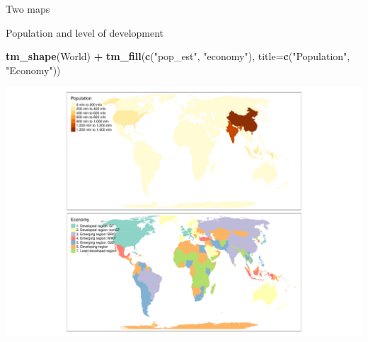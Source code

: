 \documentclass[
  ignorenonframetext,
]{beamer}
\newenvironment{Shaded}{\begin{snugshade}}{\end{snugshade}}
\newcommand{\DataTypeTok}[1]{\textcolor[rgb]{0.13,0.29,0.53}{#1}}
\newcommand{\KeywordTok}[1]{\textcolor[rgb]{0.13,0.29,0.53}{\textbf{#1}}}
\newcommand{\NormalTok}[1]{#1}
\newcommand{\OperatorTok}[1]{\textcolor[rgb]{0.81,0.36,0.00}{\textbf{#1}}}
\newcommand{\StringTok}[1]{\textcolor[rgb]{0.31,0.60,0.02}{#1}}
\begin{document}
\begin{frame}[fragile]{Two maps}
\protect\hypertarget{two-maps}{}
\begin{block}{Population and level of development}
\protect\hypertarget{population-and-level-of-development}{}
\begin{Shaded}
\begin{Highlighting}[]
\KeywordTok{tm\_shape}\NormalTok{(World) }\OperatorTok{+}\StringTok{ }\KeywordTok{tm\_fill}\NormalTok{(}\KeywordTok{c}\NormalTok{(}\StringTok{"pop\_est"}\NormalTok{, }\StringTok{"economy"}\NormalTok{), }
        \DataTypeTok{title=}\KeywordTok{c}\NormalTok{(}\StringTok{"Population"}\NormalTok{, }\StringTok{"Economy"}\NormalTok{))}
\end{Highlighting}
\end{Shaded}

\includegraphics{quick_high_quality_maps_files/figure-beamer/unnamed-chunk-12-1.pdf}
\end{block}
\end{frame}
\end{document}
